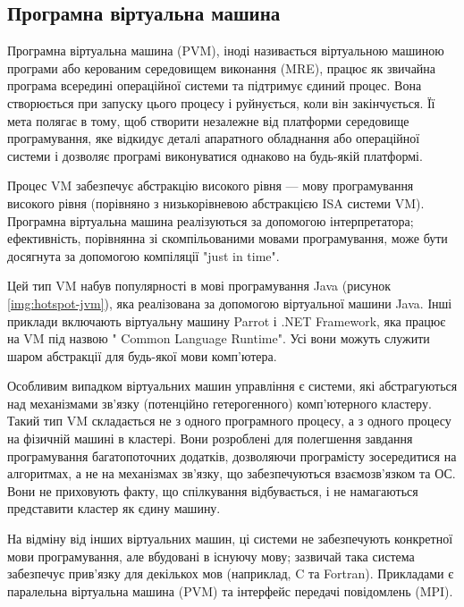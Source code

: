 \documentclass{lib/styles/default-style}
\begin{document}
\subsection{Програмна віртуальна машина}

    Програмна віртуальна машина (PVM), іноді називається віртуальною машиною програми
    або керованим середовищем виконання (MRE), 
    працює як звичайна програма всередині операційної системи та підтримує єдиний процес.
    Вона створюється при запуску цього процесу і руйнується, коли він закінчується.
    Її мета полягає в тому, щоб створити незалежне від платформи середовище програмування,
    яке відкидує деталі апаратного обладнання або операційної системи і
    дозволяє програмі виконуватися однаково на будь-якій платформі.

    Процес VM забезпечує абстракцію високого рівня
    --- мову програмування високого рівня (порівняно з низькорівневою абстракцією ISA системи VM).
    Програмна віртуальна машина реалізуються за допомогою інтерпретатора;
    ефективність, порівнянна зі скомпільованими мовами програмування, може бути досягнута за допомогою компіляції "just in time".


    Цей тип VM набув популярності в мові програмування Java (рисунок \ref{img:hotspot-jvm}), яка реалізована за допомогою віртуальної машини Java.
    Інші приклади включають віртуальну машину Parrot і .NET Framework, яка працює на VM під назвою " Common Language Runtime".
    Усі вони можуть служити шаром абстракції для будь-якої мови комп'ютера.
    
    
    Особливим випадком віртуальних машин управління є системи,
    які абстрагуються над механізмами зв'язку (потенційно гетерогенного) комп'ютерного кластеру.
    Такий тип VM складається не з одного програмного процесу, а з одного процесу на фізичній машині в кластері.
    Вони розроблені для полегшення завдання програмування багатопоточних додатків, дозволяючи програмісту зосередитися на алгоритмах,
    а не на механізмах зв'язку, що забезпечуються взаємозв'язком та ОС.
    Вони не приховують факту, що спілкування відбувається, і не намагаються представити кластер як єдину машину.

    На відміну від інших віртуальних машин, ці системи не забезпечують конкретної мови програмування,
    але вбудовані в існуючу мову;
    зазвичай така система забезпечує прив'язку для декількох мов (наприклад, C та Fortran).
    Прикладами є паралельна віртуальна машина (PVM)
    та інтерфейс передачі повідомлень (MPI).
    
\end{document}
